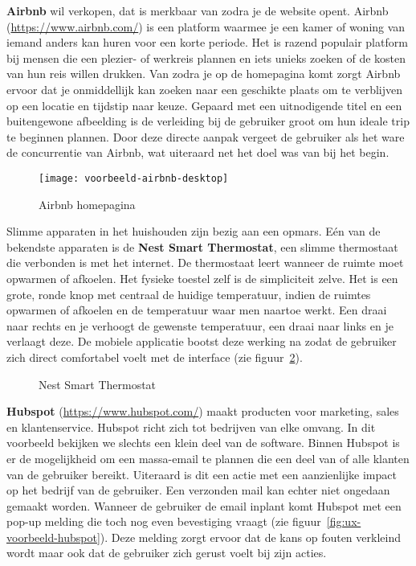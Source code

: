 \textbf{Airbnb} wil verkopen, dat is merkbaar van zodra je de website opent. Airbnb (\url{https://www.airbnb.com/}) is een platform waarmee je een kamer of woning van iemand anders kan huren voor een korte periode. Het is razend populair platform bij mensen die een plezier- of werkreis plannen en iets unieks zoeken of de kosten van hun reis willen drukken. Van zodra je op de homepagina komt zorgt Airbnb ervoor dat je onmiddellijk kan zoeken naar een geschikte plaats om te verblijven op een locatie en tijdstip naar keuze. Gepaard met een uitnodigende titel en een buitengewone afbeelding is de verleiding bij de gebruiker groot om hun ideale trip te beginnen plannen. Door deze directe aanpak vergeet de gebruiker als het ware de concurrentie van Airbnb, wat uiteraard net het doel was van bij het begin.

\begin{figure}
    \centering
    \texttt{[image: voorbeeld-airbnb-desktop]}
    \caption{Airbnb homepagina}
    \label{fig:ux-voorbeeld-airbnb}
\end{figure}

Slimme apparaten in het huishouden zijn bezig aan een opmars. Eén van de bekendste apparaten is de \textbf{Nest Smart Thermostat}, een slimme thermostaat die verbonden is met het internet. De thermostaat leert wanneer de ruimte moet opwarmen of afkoelen. Het fysieke toestel zelf is de simpliciteit zelve. Het is een grote, ronde knop met centraal de huidige temperatuur, indien de ruimtes opwarmen of afkoelen en de temperatuur waar men naartoe werkt. Een draai naar rechts en je verhoogt de gewenste temperatuur, een draai naar links en je verlaagt deze. De mobiele applicatie bootst deze werking na zodat de gebruiker zich direct comfortabel voelt met de interface (zie figuur~\ref{fig:ux-voorbeeld-nest}).

\begin{figure}
    \centering
    \qquad
    \caption{Nest Smart Thermostat}
    \label{fig:ux-voorbeeld-nest}
\end{figure}

\textbf{Hubspot} (\url{https://www.hubspot.com/}) maakt producten voor marketing, sales en klantenservice. Hubspot richt zich tot bedrijven van elke omvang. In dit voorbeeld bekijken we slechts een klein deel van de software. Binnen Hubspot is er de mogelijkheid om een massa-email te plannen die een deel van of alle klanten van de gebruiker bereikt. Uiteraard is dit een actie met een aanzienlijke impact op het bedrijf van de gebruiker. Een verzonden mail kan echter niet ongedaan gemaakt worden. Wanneer de gebruiker de email inplant komt Hubspot met een pop-up melding die toch nog even bevestiging vraagt (zie figuur~\ref{fig:ux-voorbeeld-hubspot}). Deze melding zorgt ervoor dat de kans op fouten verkleind wordt maar ook dat de gebruiker zich gerust voelt bij zijn acties.

